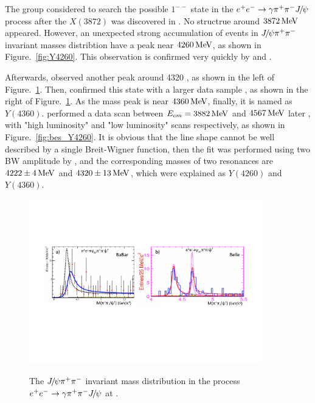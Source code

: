 The \babar group considered to search the possible $1^{--}$ state in the ${e^+}{e^-}\rightarrow{\ensuremath{\gamma}}{\ensuremath{{\pi}^+}}{\ensuremath{{\pi}^-}}{\ensuremath{{J\mskip -3mu/\mskip -2mu\psi}}}$ process after the $X(3872)$ was discovered in \belle.
No structrue around $3872 \text{\,Me\kern -0.1em V}$ appeared.
However,
an unexpected strong accumulation of events in ${{J\mskip -3mu/\mskip -2mu\psi}}{{\pi}^+}{{\pi}^-}$ invariant masses distribtion have a peak near $4260 \text{\,Me\kern -0.1em V}$\supercite{PhysRevD.71.052001},
as shown in Figure.~\ref{fig:Y4260}.
This observation is confirmed very quickly by \cleo\supercite{PhysRevLett.96.162003} and \belle\supercite{PhysRevLett.99.182004}.

Afterwards,
\babar observed another peak around 4320 \mev\supercite{PhysRevLett.98.212001},
as shown in the left of Figure.~\ref{fig:Y4360}.
Then, 
\belle confirmed this state with a larger data sample \supercite{PhysRevLett.99.142002},
as shown in the right of Figure.~\ref{fig:Y4360}.
As the mass peak is near $4360 \text{\,Me\kern -0.1em V}$,
finally, it is named as $Y(4360)$.
\besiii performed a data scan between $E_{cm}=3882 \text{\,Me\kern -0.1em V}$ and $4567 \text{\,Me\kern -0.1em V}$ later \supercite{PhysRevLett.118.092001} ,
with "high luminosity" and "low luminosity" scans respectively,
as shown in Figure.~\ref{fig:bes_Y4260}.
It is obvious that the line shape cannot be well described by a single Breit-Wigner function,
then the fit was performed  using two BW amplitude by \besiii,
and the corresponding masses of two resonances are $4222\pm4 \text{\,Me\kern -0.1em V}$ and $4320\pm13 \text{\,Me\kern -0.1em V}$,
which were explained as $Y(4260)$ and $Y(4360)$.


\begin{figure}[!hbtp]
\centering
   \includegraphics[width=0.9\textwidth]{Figures/01_Introduction/Exotic/neutral_particle/babar-belle_y4360} \\%
   \caption{ The ${{J\mskip -3mu/\mskip -2mu\psi}}{{\pi}^+}{{\pi}^-}$ invariant mass distribution in the process ${e^+}{e^-}\rightarrow{\ensuremath{\gamma}}{\ensuremath{{\pi}^+}}{\ensuremath{{\pi}^-}}{\ensuremath{{J\mskip -3mu/\mskip -2mu\psi}}}$ at \babar\supercite{PhysRevD.71.052001}.}
\label{fig:Y4360}
\end{figure}


